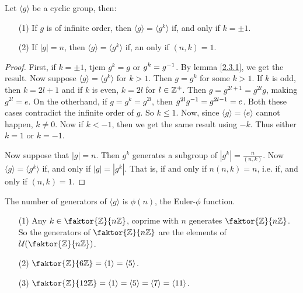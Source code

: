 \begin{lemma}\label{lemma_2.3.7}
  Let $\langle g \rangle$ be a cyclic group, then:
  \begin{enumerate}
    \item[(1)] If $g$ is of infinite order, then  $\langle g
      \rangle=\langle g^k \rangle$ if, and only if $k=\pm{1}$.

    \item[(2)] If $|g|=n$, then $\langle g \rangle=\langle g^k
      \rangle$ if, an only if $(n,k)=1$.
  \end{enumerate}
\end{lemma}
\begin{proof}
  First, if $k=\pm 1$, tjem  $g^k=g$ or  $g^k=g^{-1}$. By lemma \ref{2.3.1},
  we get the result. Now suppose $\langle g \rangle=\langle g^k \rangle$ for
  $k>1$. Then $g=g^k$ for some  $k>1$. If  $k$ is odd, then  $k=2l+1$ and if
  $k$ is even, $k=2l$ for  $l \in \mathbb{Z}^+$. Then  $g=g^{2l+1}=g^{2l}g$, making
  $g^{2l}=e$. On the otherhand, if $g=g^k=g^{2l}$, then $g^{2l}g^{-1}=g^{2l-1}=e$.
  Both these cases contradict the infinite order of $g$. So  $k \leq 1$. Now,
  since $\langle g \rangle=\langle e \rangle$ cannot happen, $k \neq 0$. Now if
  $k<-1$, then we get the same result using  $-k$. Thus either  $k=1$ or  $k=-1$.

  Now suppose that  $|g|=n$. Then $g^k$ generates a subgroup of
  $|g^k|=\frac{n}{(n,k)}$. Now $\langle g \rangle=\langle g^k \rangle$ if, and
  only if $|g|=|g^k|$. That is, if and only if  $n(n,k)=n$, i.e. if, and only
  if $(n,k)=1$.
\end{proof}
\begin{corollary}
  The number of generators of $\langle g \rangle$ is $\phi(n)$, the
  Euler-$\phi$ function.
\end{corollary}

\begin{example}
  \begin{enumerate}
    \item[(1)] Any $k \in \faktor{\Z}{n\Z}$, coprime with $n$ generates
      $\faktor{\Z}{n\Z}$. So the generators of $\faktor{\Z}{n\Z}$ are the
      elements of $\Uc{(\faktor{\Z}{n\Z})}$.

    \item[(2)] $\faktor{\Z}{6\Z}=\langle 1 \rangle=\langle 5 \rangle$.

    \item[(3)] $\faktor{\Z}{12\Z}=\langle 1 \rangle=\langle 5
      \rangle=\langle 7 \rangle=\langle 11 \rangle$.
  \end{enumerate}
\end{example}

